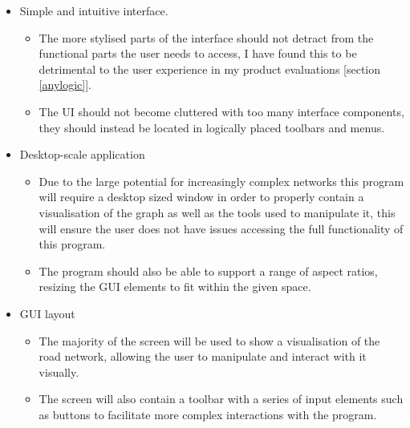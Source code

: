     \begin{itemize}
        \item Simple and intuitive interface.
        \begin{itemize}
            \item The more stylised parts of the interface should not detract from the functional parts the user needs to access, I have found this to be detrimental to the user experience in my product evaluations [section \ref{anylogic}].
            \item The UI should not become cluttered with too many interface components, they should instead be located in logically placed toolbars and menus.
        \end{itemize}
        \item Desktop-scale application
        \begin{itemize}
            \item Due to the large potential for increasingly complex networks this program will require a desktop sized window in order to properly contain a visualisation of the graph as well as the tools used to manipulate it, this will ensure the user does not have issues accessing the full functionality of this program.
            \item The program should also be able to support a range of aspect ratios, resizing the GUI elements to fit within the given space.
        \end{itemize}
        \item GUI layout
        \begin{itemize}
            \item The majority of the screen will be used to show a visualisation of the road network, allowing the user to manipulate and interact with it visually.
            \item The screen will also contain a toolbar with a series of input elements such as buttons to facilitate more complex interactions with the program.
        \end{itemize}
    \end{itemize}
